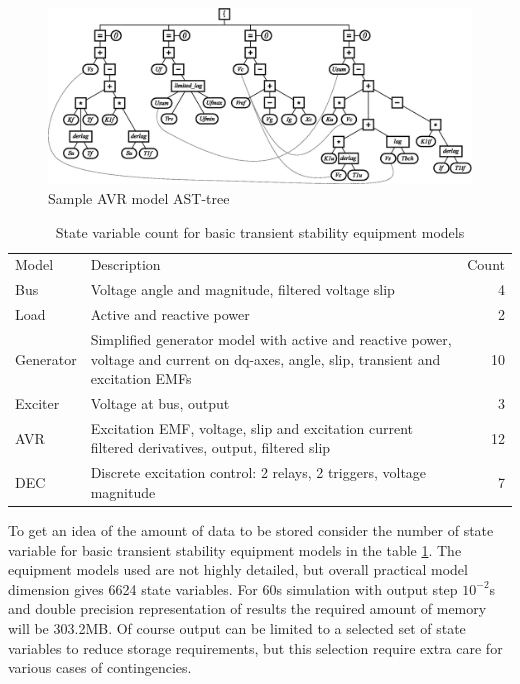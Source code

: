 \documentclass[lettersize,journal]{IEEEtran}
\begin{document}
\begin{figure}[h]
	\centering
	\includegraphics[width=\columnwidth]{ast.eps}
	\caption{Sample AVR model AST-tree }
	\label{fig_ast}
\end{figure}


\begin{table}[!h]
	\caption{State variable count for basic transient stability equipment models\label{tab:statvarscount}}
	\centering
	\begin{tabularx}{\columnwidth}{l|X|r}
		\hline
		Model & Description & Count\\
		\hlineB{3}	
		Bus & Voltage angle and magnitude, filtered voltage slip & 4\\
		\hline
		Load & Active and reactive power & 2\\
		\hline
		Generator & Simplified generator model with active and reactive power, voltage and current on dq-axes, 
		angle, slip, transient and excitation EMFs & 10\\
		\hline
		Exciter & Voltage at bus, output & 3\\
		\hline
		AVR & Excitation EMF, voltage, slip and excitation current filtered derivatives, output, filtered slip & 12\\
		\hline
		DEC & Discrete excitation control: 2 relays, 2 triggers, voltage magnitude & 7\\
		\hline
	\end{tabularx}
\end{table}

To get an idea of the amount of data to be stored consider the number of state variable for basic transient 
stability equipment models in the table \ref{tab:statvarscount}. The equipment models used are not 
highly detailed, but overall practical model dimension gives 6624 state variables. For 60s simulation with
output step \(10^{-2}\)s and double precision representation of results the required amount of memory will be 303.2MB.
Of course output can be limited to a selected set of state variables to reduce storage requirements,
but this selection require extra care for various cases of contingencies.
\end{document}
